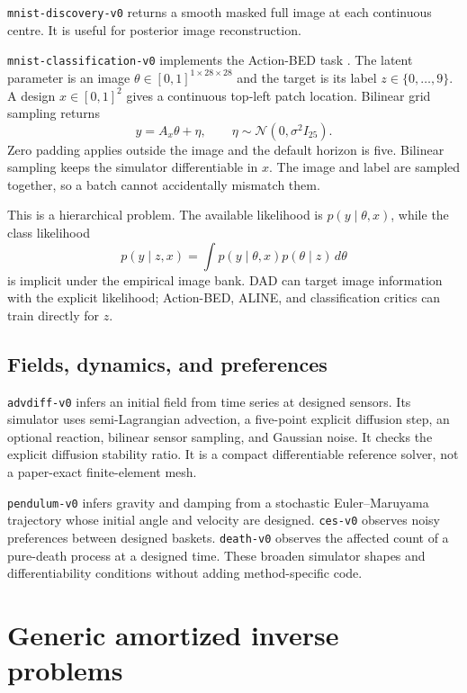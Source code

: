 \documentclass[11pt]{article}
\begin{document}
\texttt{mnist-discovery-v0} returns a smooth masked full image at each continuous
centre. It is useful for posterior image reconstruction.

\texttt{mnist-classification-v0} implements the Action-BED task
\cite{rossa2026actionbed}. The latent parameter is an image
$\theta\in[0,1]^{1\times28\times28}$ and the target is its label
$z\in\{0,\ldots,9\}$. A design $x\in[0,1]^2$ gives a continuous top-left
patch location. Bilinear grid sampling returns
\begin{equation}
  y=A_x\theta+\eta,\qquad
  \eta\sim\mathcal N(0,\sigma^2 I_{25}).
\end{equation}
Zero padding applies outside the image and the default horizon is five. Bilinear
sampling keeps the simulator differentiable in $x$. The image and label are sampled
together, so a batch cannot accidentally mismatch them.

This is a hierarchical problem. The available likelihood is
$p(y\mid\theta,x)$, while the class likelihood
\begin{equation}
  p(y\mid z,x)=\int p(y\mid\theta,x)p(\theta\mid z)\,d\theta
\end{equation}
is implicit under the empirical image bank. DAD can target image information with
the explicit likelihood; Action-BED, ALINE, and classification critics can train
directly for $z$.

\subsection{Fields, dynamics, and preferences}

\texttt{advdiff-v0} infers an initial field from time series at designed sensors.
Its simulator uses semi-Lagrangian advection, a five-point explicit diffusion step,
an optional reaction, bilinear sensor sampling, and Gaussian noise. It checks the
explicit diffusion stability ratio. It is a compact differentiable reference
solver, not a paper-exact finite-element mesh.

\texttt{pendulum-v0} infers gravity and damping from a stochastic
Euler--Maruyama trajectory whose initial angle and velocity are designed.
\texttt{ces-v0} observes noisy preferences between designed baskets.
\texttt{death-v0} observes the affected count of a pure-death process at a designed
time. These broaden simulator shapes and differentiability conditions without
adding method-specific code.

\section{Generic amortized inverse problems}
\end{document}
